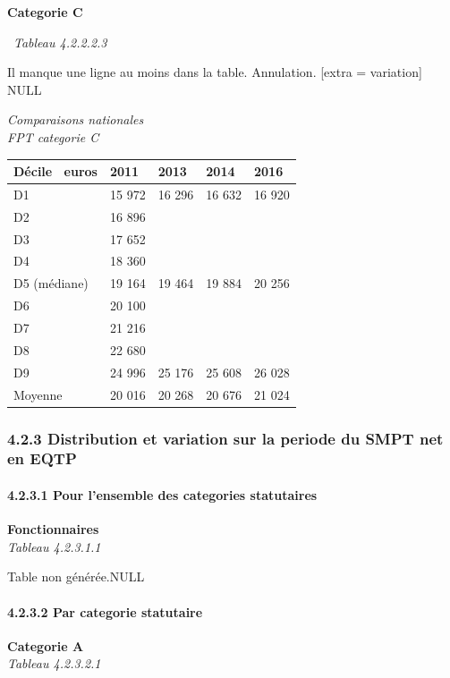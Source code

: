 \textbf{Categorie C}

~\emph{Tableau 4.2.2.2.3}

Il manque une ligne au moins dans la table. Annulation. {[}extra =
variation{]}\\
NULL

\emph{Comparaisons nationales}\\
\emph{FPT categorie C}

\begin{longtable}[]{@{}lllll@{}}
\toprule
Décile ~euros & 2011 & 2013 & 2014 & 2016\tabularnewline
\midrule
\endhead
D1 & 15 972 & 16 296 & 16 632 & 16 920\tabularnewline
D2 & 16 896 & & &\tabularnewline
D3 & 17 652 & & &\tabularnewline
D4 & 18 360 & & &\tabularnewline
D5 (médiane) & 19 164 & 19 464 & 19 884 & 20 256\tabularnewline
D6 & 20 100 & & &\tabularnewline
D7 & 21 216 & & &\tabularnewline
D8 & 22 680 & & &\tabularnewline
D9 & 24 996 & 25 176 & 25 608 & 26 028\tabularnewline
Moyenne & 20 016 & 20 268 & 20 676 & 21 024\tabularnewline
\bottomrule
\end{longtable}

\hypertarget{distribution-et-variation-sur-la-periode-du-smpt-net-en-eqtp}{%
\subsubsection{4.2.3 Distribution et variation sur la periode du SMPT
net en
EQTP}\label{distribution-et-variation-sur-la-periode-du-smpt-net-en-eqtp}}

\hypertarget{pour-lensemble-des-categories-statutaires}{%
\paragraph{4.2.3.1 Pour l'ensemble des categories
statutaires}\label{pour-lensemble-des-categories-statutaires}}

\textbf{Fonctionnaires}\\
\hspace*{0.333em}\emph{Tableau 4.2.3.1.1}

Table non générée.NULL

\hypertarget{par-categorie-statutaire-1}{%
\paragraph{4.2.3.2 Par categorie
statutaire}\label{par-categorie-statutaire-1}}

\textbf{Categorie A}\\
\hspace*{0.333em}\emph{Tableau 4.2.3.2.1}

